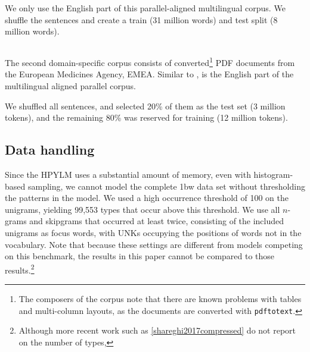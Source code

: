   We only use the English part of this parallel-aligned multilingual corpus. We shuffle the sentences and create a train (31 million words) and test split (8 million words). 
    
   
  \subsection{\emea}
  The second domain-specific corpus consists of converted\footnote{The composers of the corpus note that there are known problems with tables and multi-column layouts, as the documents are converted with \texttt{pdftotext}.} PDF documents from the European Medicines Agency, EMEA\cite{tiedemann2009news}. Similar to \jrc, \emea is the English part of the multilingual aligned parallel corpus.
  
  We shuffled all sentences, and selected 20\% of them as the test set (3 million tokens), and the remaining 80\% was reserved for training (12 million tokens).
  
  
  \subsection{Data handling}
	Since the HPYLM uses a substantial amount of memory, even with histogram-based sampling, we cannot model the complete 1bw data set without thresholding the patterns in the model. We used a high occurrence threshold of 100 on the unigrams, yielding 99,553 types that occur above this threshold. We use all $n$-grams and skipgrams that occurred at least twice, consisting of the included unigrams as focus words, with UNKs occupying the positions of words not in the vocabulary. Note that because these settings are different from models competing on this benchmark, the results in this paper cannot be compared to those results.\footnote{Although more recent work such as \ref{shareghi2017compressed} do not report on the number of types,  }
    
